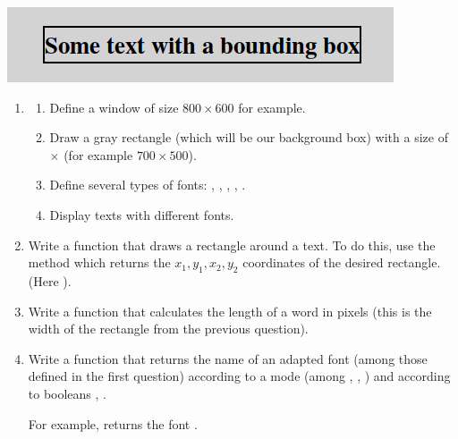 \documentclass[11pt,class=report,crop=false]{standalone}
\begin{document}
\begin{activite}


\begin{center}
\includegraphics[scale=0.6]{screen-markdown-2-en}
\end{center}

\begin{enumerate}
  \item 
  \begin{enumerate}
    \item Define a  window of size $800 \times 600$ for example.

    \item Draw a gray rectangle (which will be our background box) with a size of  $\times$  (for example $700 \times 500$).

    \item Define several types of fonts: , , , , .
    
    \item Display texts with different fonts.
  \end{enumerate}
    
  \item Write a  function that draws a rectangle around a text. To do this, use the  method which returns the $x_1,y_1,x_2,y_2$ coordinates of the desired rectangle. (Here ).
  
  \item Write a  function that calculates the length of a word in pixels (this is the width of the rectangle from the previous question).
  
  \item Write a  function that returns the name of an adapted font (among those defined in the first question) according to a mode (among , , ) and according to booleans , .
  
  For example,  returns the font .
\end{enumerate}

\end{activite}
\end{document}
